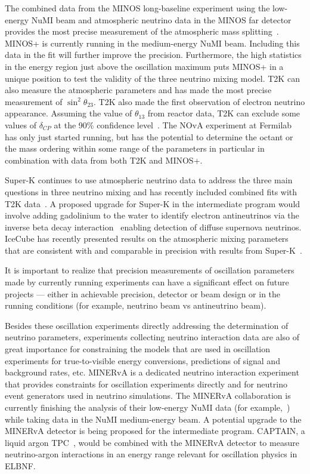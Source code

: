 The combined data from the MINOS long-baseline experiment using the
low-energy NuMI beam and atmospheric neutrino data in the MINOS far
detector provides the most precise measurement of the atmospheric mass
splitting~\cite{Adamson:2014vgd}.  MINOS+ is currently running in the
medium-energy NuMI beam.  Including this data in the fit will further
improve the precision.  Furthermore, the high statistics in the energy
region just above the oscillation maximum puts MINOS+ in a unique
position to test the validity of the three neutrino mixing model. T2K
can also measure the atmospheric parameters and has made the most
precise measurement of $\sin^2\theta_{23}$.  T2K also made the first
observation of electron neutrino appearance.  Assuming the value of
$\theta_{13}$ from reactor data, T2K can exclude some values of
$\delta_{CP}$ at the 90\% confidence level~\cite{Abe:2015awa}.  The
NOvA experiment at Fermilab has only just started running, but has the
potential to determine the octant or the mass ordering within some
range of the parameters in particular in combination with data from
both T2K and MINOS+.

Super-K continues to use atmospheric neutrino data to address
the three main questions in three neutrino mixing and has recently
included combined fits with T2K data~\cite{Wendell:2014dka}.  A
proposed upgrade for Super-K in the intermediate program would involve
adding gadolinium to the water to identify electron antineutrinos via
the inverse beta decay interaction~\cite{Beacom:2003nk} enabling
detection of diffuse supernova neutrinos. IceCube has recently
presented results on the atmospheric mixing parameters that are
consistent with and comparable in precision with results from
Super-K~\cite{Aartsen:2014yll}.

It is important to realize that precision measurements of oscillation
parameters made by currently running experiments can have a
significant effect on future projects --- either in achievable
precision, detector or beam design or in the running conditions (for
example, neutrino beam vs antineutrino beam).

Besides these oscillation experiments directly addressing the
determination of neutrino parameters, experiments collecting neutrino
interaction data are also of great importance for constraining the models
that are used in oscillation experiments for true-to-visible energy
conversions, predictions of signal and background rates, etc.  MINERvA
is a dedicated neutrino interaction experiment that provides
constraints for oscillation experiments directly and for neutrino
event generators used in neutrino simulations.  The MINERvA
collaboration is currently finishing the analysis of their low-energy
NuMI data (for example,~\cite{Walton:2014esl}) while taking data in
the NuMI medium-energy beam.  A potential upgrade to the MINERvA
detector is being proposed for the intermediate program.  CAPTAIN, a
liquid argon TPC~\cite{Berns:2013usa}, would be combined with the
MINERvA detector to measure neutrino-argon interactions in an energy
range relevant for oscillation physics in ELBNF.

